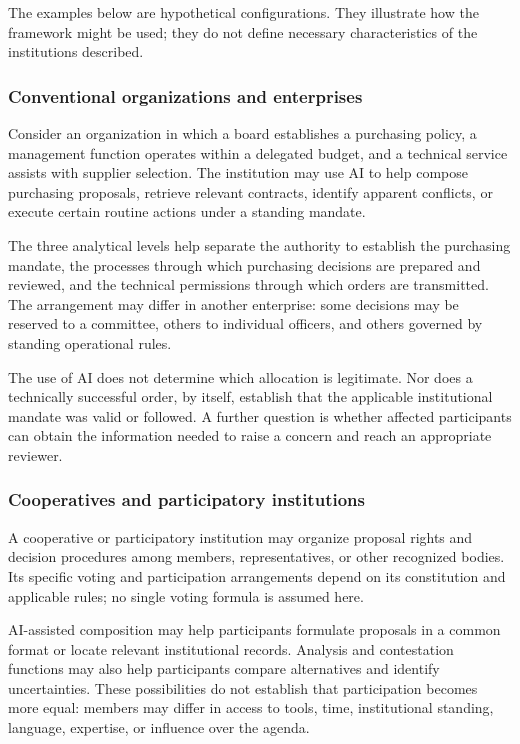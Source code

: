 \documentclass[
  10pt,
]{article}
\begin{document}
The examples below are hypothetical configurations. They illustrate how
the framework might be used; they do not define necessary
characteristics of the institutions described.

\subsubsection{Conventional organizations and
enterprises}\label{conventional-organizations-and-enterprises}

Consider an organization in which a board establishes a purchasing
policy, a management function operates within a delegated budget, and a
technical service assists with supplier selection. The institution may
use AI to help compose purchasing proposals, retrieve relevant
contracts, identify apparent conflicts, or execute certain routine
actions under a standing mandate.

The three analytical levels help separate the authority to establish the
purchasing mandate, the processes through which purchasing decisions are
prepared and reviewed, and the technical permissions through which
orders are transmitted. The arrangement may differ in another
enterprise: some decisions may be reserved to a committee, others to
individual officers, and others governed by standing operational rules.

The use of AI does not determine which allocation is legitimate. Nor
does a technically successful order, by itself, establish that the
applicable institutional mandate was valid or followed. A further
question is whether affected participants can obtain the information
needed to raise a concern and reach an appropriate reviewer.

\subsubsection{Cooperatives and participatory
institutions}\label{cooperatives-and-participatory-institutions}

A cooperative or participatory institution may organize proposal rights
and decision procedures among members, representatives, or other
recognized bodies. Its specific voting and participation arrangements
depend on its constitution and applicable rules; no single voting
formula is assumed here.

AI-assisted composition may help participants formulate proposals in a
common format or locate relevant institutional records. Analysis and
contestation functions may also help participants compare alternatives
and identify uncertainties. These possibilities do not establish that
participation becomes more equal: members may differ in access to tools,
time, institutional standing, language, expertise, or influence over the
agenda.
\end{document}
